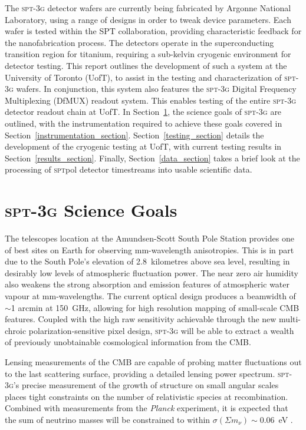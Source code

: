 \documentclass[iop]{emulateapj}
\begin{document}
The \textsc{spt-3g} detector wafers are currently being fabricated by Argonne National Laboratory, using a range of designs in order to tweak device parameters.  Each wafer is tested within the SPT collaboration, providing characteristic feedback for the nanofabrication process.  The detectors operate in the superconducting transition region for titanium, requiring a sub-kelvin cryogenic environment for detector testing.  This report outlines the development of such a system at the University of Toronto (UofT), to assist in the testing and characterization of \textsc{spt-3g} wafers.  In conjunction, this system also features the \textsc{spt-3g} Digital Frequency Multiplexing (DfMUX) readout system.  This enables testing of the entire \textsc{spt-3g} detector readout chain at UofT.
In Section~\ref{science_section}, the science goals of \textsc{spt-3g} are outlined, with the instrumentation required to achieve these goals covered in Section~\ref{instrumentation_section}.  Section~\ref{testing_section} details the development of the cryogenic testing at UofT, with current testing results in Section~\ref{results_section}.  Finally, Section~\ref{data_section} takes a brief look at the processing of \textsc{spt}pol detector timestreams into usable scientific data.



\section{\textsc{spt-3g} Science Goals}
\label{science_section}

The telescopes location at the Amundsen-Scott South Pole Station provides one of best sites on Earth for observing mm-wavelength anisotropies.  This is in part due to the South Pole's elevation of 2.8~kilometres above sea level, resulting in desirably low levels of atmospheric fluctuation power.  The near zero air humidity also weakens the strong absorption and emission features of atmospheric water vapour at mm-wavelengths.
The current optical design produces a beamwidth of $\sim$1 arcmin at 150~GHz, allowing for high resolution mapping of small-scale CMB features.  Coupled with the high raw sensitivity achievable through the new multi-chroic polarization-sensitive pixel design, \textsc{spt-3g} will be able to extract a wealth of previously unobtainable cosmological information from the CMB.

Lensing measurements of the CMB are capable of probing matter fluctuations out to the last scattering surface, providing a detailed lensing power spectrum.  \textsc{spt-3g}'s precise measurement of the growth of structure on small angular scales places tight constraints on the number of relativistic species at recombination.  Combined with measurements from the \textit{Planck} experiment, it is expected that the sum of neutrino masses will be constrained to within $\sigma(\Sigma m_{\nu})\sim0.06$~eV \citep{benson_spt-3g:_2014}.
\end{document}
